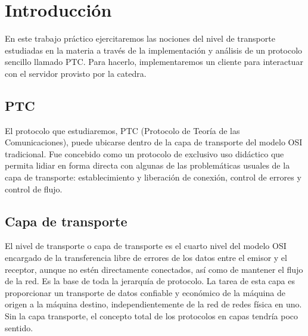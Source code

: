 \newpage
\section{Introducción}
\indent En este trabajo práctico ejercitaremos las nociones del nivel de transporte estudiadas en la materia a través de la implementación y análisis de un protocolo sencillo llamado PTC. Para hacerlo, implementaremos un cliente para interactuar con el servidor provisto por la catedra.\\
\subsection{PTC} 
\indent El protocolo que estudiaremos, PTC (Protocolo de Teoría de las
Comunicaciones), puede ubicarse dentro de la capa de transporte del modelo OSI
tradicional. Fue concebido como un protocolo de exclusivo uso didáctico que
permita lidiar en forma directa con algunas de las problemáticas usuales de la
capa de transporte: establecimiento y liberación de conexión, control de errores
y control de flujo.

\subsection{Capa de transporte}
\indent El nivel de transporte o capa de transporte es el cuarto nivel del
modelo OSI encargado de la transferencia libre de errores de los datos entre el
emisor y el receptor, aunque no estén directamente conectados, así como de
mantener el flujo de la red. Es la base de toda la jerarquía de protocolo. La
tarea de esta capa es proporcionar un transporte de datos confiable y económico
de la máquina de origen a la máquina destino, independientemente de la red de
redes física en uno. Sin la capa transporte, el concepto total de los protocolos
en capas tendría poco sentido.